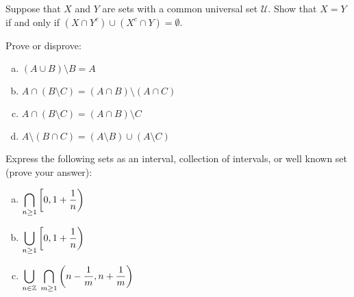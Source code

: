 \documentclass[11pt,letterpaper]{article}
\begin{document}
 Suppose that $X$ and $Y$ are sets with a common universal set $\mathscr{U}$. Show that $X= Y$ if and only if $(X \cap Y^c) \cup (X^c \cap Y)= \emptyset$. \pspace





\newpage





 Prove or disprove:
	\begin{enumerate}[(a)]
	\item $(A \cup B) \setminus B= A$
	\item $A \cap (B \setminus C)= (A \cap B) \setminus (A \cap C)$
	\item $A \cap (B \setminus C)= (A \cap B) \setminus C$
	\item $A \setminus (B \cap C)= (A \setminus B) \cup (A \setminus C)$
	\end{enumerate}





\newpage





 Express the following sets as an interval, collection of intervals, or well known set (prove your answer): 
	\begin{enumerate}[(a)]
	\item $\displaystyle\bigcap_{n \geq 1} \left[0, 1 + \frac{1}{n} \right)$
	\item $\displaystyle\bigcup_{n \geq 1} \left[0, 1 + \frac{1}{n} \right)$
	\item $\displaystyle\bigcup_{n \in \mathbb{Z}}\; \bigcap_{m \geq 1} \left( n - \frac{1}{m}, n + \frac{1}{m} \right)$
	\end{enumerate}
\end{document}
